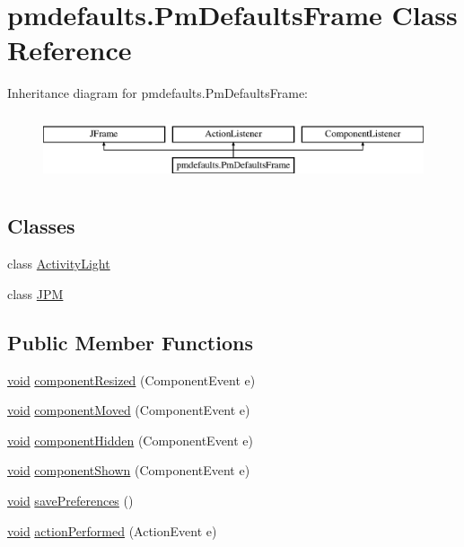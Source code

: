 \hypertarget{classpmdefaults_1_1_pm_defaults_frame}{}\section{pmdefaults.\+Pm\+Defaults\+Frame Class Reference}
\label{classpmdefaults_1_1_pm_defaults_frame}
Inheritance diagram for pmdefaults.\+Pm\+Defaults\+Frame\+:\begin{figure}[H]
\begin{center}
\leavevmode
\includegraphics[height=2.000000cm]{classpmdefaults_1_1_pm_defaults_frame}
\end{center}
\end{figure}
\subsection*{Classes}
\begin{DoxyCompactItemize}
\item 
class \hyperlink{classpmdefaults_1_1_pm_defaults_frame_1_1_activity_light}{Activity\+Light}
\item 
class \hyperlink{classpmdefaults_1_1_pm_defaults_frame_1_1_j_p_m}{J\+PM}
\end{DoxyCompactItemize}
\subsection*{Public Member Functions}
\begin{DoxyCompactItemize}
\item 
\hyperlink{sound_8c_ae35f5844602719cf66324f4de2a658b3}{void} \hyperlink{classpmdefaults_1_1_pm_defaults_frame_a652bc17fc422888f91ac32c583cb81b0}{component\+Resized} (Component\+Event e)
\item 
\hyperlink{sound_8c_ae35f5844602719cf66324f4de2a658b3}{void} \hyperlink{classpmdefaults_1_1_pm_defaults_frame_aa3219490788a4bbc91d029508a170027}{component\+Moved} (Component\+Event e)
\item 
\hyperlink{sound_8c_ae35f5844602719cf66324f4de2a658b3}{void} \hyperlink{classpmdefaults_1_1_pm_defaults_frame_a201b38c339ecd6f9935c4819bd5ff773}{component\+Hidden} (Component\+Event e)
\item 
\hyperlink{sound_8c_ae35f5844602719cf66324f4de2a658b3}{void} \hyperlink{classpmdefaults_1_1_pm_defaults_frame_a1aff83b610e2d10e67991b7e2d36b9a5}{component\+Shown} (Component\+Event e)
\item 
\hyperlink{sound_8c_ae35f5844602719cf66324f4de2a658b3}{void} \hyperlink{classpmdefaults_1_1_pm_defaults_frame_a57ebc385fe0d6b33c9403624f60a3c2f}{save\+Preferences} ()
\item 
\hyperlink{sound_8c_ae35f5844602719cf66324f4de2a658b3}{void} \hyperlink{classpmdefaults_1_1_pm_defaults_frame_a99daa20753baa4ff2134a4d9b8d380dc}{action\+Performed} (Action\+Event e)
\end{DoxyCompactItemize}


